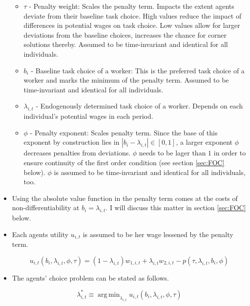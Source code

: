 \documentclass{article}
\DeclareMathOperator*{\argmin}{arg\,min}						%
\begin{document}
\begin{itemize}
		\begin{itemize}	
			\item{$\tau$ - Penalty weight: Scales the penalty term. Impacts the extent agents deviate from their baseline task choice. High values reduce the impact of differences in potential wages on task choice. Low values allow for larger deviations from the baseline choices, increases the chance for corner solutions thereby. Assumed to be time-invariant and identical for all individuals.}
			\item{$b_i$ - Baseline task choice of a worker: This is the preferred task choice of a worker and marks the minimum of the penalty term. Assumed to be time-invariant and identical for all individuals.}
			\item{$\lambda_{i, t}$ - Endogenously determined task choice of a worker. Depends on each individual's potential wages in each period.}
			\item{$\phi$ - Penalty exponent: Scales penalty term. Since the base of this exponent by construction lies in $|b_i - \lambda_{i, t}| \in [0, 1]$, a larger exponent $\phi$ decreases penalties from deviations. $\phi$ needs to be lager than $1$ in order to ensure continuity of the first order condition (see section \ref{sec:FOC} below). $\phi$ is assumed to be time-invariant and identical for all individuals, too.} 
		\end{itemize}

		\item{Using the absolute value function in the penalty term comes at the costs of non-differentiability at $b_i = \lambda_{i, t}$. I will discuss this matter in section \ref{sec:FOC} below.}
		\item{Each agents utility $u_{i, t}$ is assumed to be her wage lessened by the penalty term.}

		\begin{equation}
			u_{i, t}(b_i, \lambda_{i, t}, \phi, \tau) = (1-\lambda_{i, t}) w_{1, i, t} + \lambda_{i, t} w_{2, i, t} - p(\tau, \lambda_{i, t}, b_i, \phi)
		\end{equation}
		\item{The agents' choice problem can be stated as follows.}

		\begin{equation} \label{eq:optimization_problem}
		\lambda^*_{i, t} \equiv \argmin_{\lambda_{i, t}} u_{i,t}(b_i, \lambda_{i, t}, \phi, \tau)
		\end{equation}

	\end{itemize}
\end{document}
